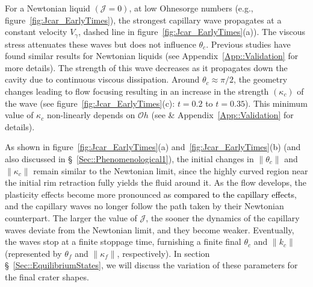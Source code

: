 \documentclass[final]{jfm}
\newcommand*\red{\textcolor{black}}
\begin{document}
For a Newtonian liquid $\left(\mathcal{J} = 0\right)$, at low Ohnesorge numbers (e.g., figure~\ref{fig:Jcar_EarlyTimes}), the strongest capillary wave propagates at a constant velocity $V_\gamma$, dashed line in figure~\ref{fig:Jcar_EarlyTimes}(a)). The viscous stress attenuates these waves but does not influence $\theta_c$. Previous studies \citep{krishnan2017scaling, gordillo2019capillary} have found similar results for Newtonian liquids (see Appendix~\ref{App::Validation} for more details). The strength of this wave decreases as it propagates down the cavity due to continuous viscous dissipation. Around $\theta_c \approx \pi/2$, the geometry changes leading to flow focusing resulting in an increase in the strength $\left(\kappa_c\right)$ of the wave (see figure~\ref{fig:Jcar_EarlyTimes}(c): $t = 0.2$ to $t = 0.35$). This minimum value of $\kappa_c$ non-linearly depends on $\mathcal{O}h$ (see \citet{gordillo2019capillary} \& Appendix~\ref{App::Validation} for details).

As shown in figure~\ref{fig:Jcar_EarlyTimes}(a) and~\ref{fig:Jcar_EarlyTimes}(b) (and also discussed in \S~\ref{Sec::Phenomenological1}), the initial changes in $\|\theta_c\|$ and $\|\kappa_c\|$ remain similar to the Newtonian limit, since the highly curved region near the initial rim retraction fully yields the fluid around it. As the flow develops, the plasticity effects become more pronounced \red{as compared to the capillary effects}, and the capillary waves no longer follow the path taken by their Newtonian counterpart.
The larger the value of $\mathcal{J}$, the sooner the dynamics of the capillary waves deviate from the Newtonian limit, and they become weaker. Eventually, the waves stop at a finite stoppage time, furnishing a finite final $\theta_c$ and $\|k_c\|$ (represented by $\theta_f$ and $\|\kappa_f\|$, respectively). In section \S~\ref{Sec::EquilibriumStates}, we will discuss the variation of these parameters for the final crater shapes.
\end{document}
